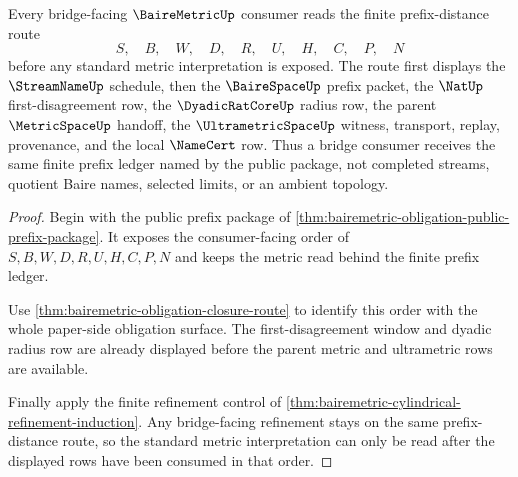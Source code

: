 \begin{theorem}
\label{thm:bairemetric-bridge-route}
Every bridge-facing $\BaireMetricUp$ consumer reads the finite prefix-distance route
$$
S,\quad B,\quad W,\quad D,\quad R,\quad U,\quad H,\quad C,\quad P,\quad N
$$
before any standard metric interpretation is exposed. The route first displays the $\StreamNameUp$ schedule, then the $\BaireSpaceUp$ prefix packet, the $\NatUp$ first-disagreement row, the $\DyadicRatCoreUp$ radius row, the parent $\MetricSpaceUp$ handoff, the $\UltrametricSpaceUp$ witness, transport, replay, provenance, and the local $\NameCert$ row. Thus a bridge consumer receives the same finite prefix ledger named by the public package, not completed streams, quotient Baire names, selected limits, or an ambient topology.
\end{theorem}
\begin{proof}
Begin with the public prefix package of \autoref{thm:bairemetric-obligation-public-prefix-package}. It exposes the consumer-facing order of $S,B,W,D,R,U,H,C,P,N$ and keeps the metric read behind the finite prefix ledger.

Use \autoref{thm:bairemetric-obligation-closure-route} to identify this order with the whole paper-side obligation surface. The first-disagreement window and dyadic radius row are already displayed before the parent metric and ultrametric rows are available.

Finally apply the finite refinement control of \autoref{thm:bairemetric-cylindrical-refinement-induction}. Any bridge-facing refinement stays on the same prefix-distance route, so the standard metric interpretation can only be read after the displayed rows have been consumed in that order.
\end{proof}

